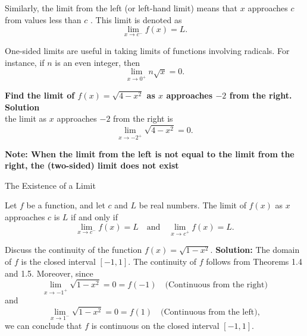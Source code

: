 \documentclass[12pt]{article}
\theoremstyle{beautifulthm}
\begin{document}
Similarly, the limit from the left (or left-hand limit) means that \( x \) approaches \( c \) from values less than \( c \) . This limit is denoted as
\[
\lim_{x \to c^-} f(x) = L.
\]

One-sided limits are useful in taking limits of functions involving radicals. For instance, if \( n \) is an even integer, then
\[
\lim_{x \to 0^+} n\sqrt{x} = 0.
\]

\begin{tcolorbox}[colback=examplebg, colframe=red!75!black, title=\textbf{EXAMPLE 2: A One-Sided Limit}, fonttitle=\bfseries, sharp corners]
\textbf{Find the limit of \( f(x) = \sqrt{4 - x^2} \) as \( x \) approaches \(-2\) from the right.}
\tcblower
\textbf{Solution} \\
the limit as \( x \) approaches \(-2\) from the right is 
\[
\lim_{x \to -2^+} \sqrt{4 - x^2} = 0.
\]

\end{tcolorbox}
\textbf{Note: When the limit from the left is not equal to the limit from the right, the (two-sided) limit does not exist}
\begin{mytheorem}{The Existence of a Limit}{}

Let \( f \) be a function, and let \( c \) and \( L \) be real numbers. The limit of \( f(x) \) as \( x \) approaches \( c \) is \( L \) if and only if
\[
\lim_{x \to c^-} f(x) = L \quad \text{and} \quad \lim_{x \to c^+} f(x) = L.
\]
\end{mytheorem}
\begin{tcolorbox}[colback=examplebg, colframe=red!75!black, title=\textbf{EXAMPLE 3: Continuity on a Closed Interval}, fonttitle=\bfseries, sharp corners]
Discuss the continuity of the function $f(x) = \sqrt{1 - x^2}$.
\tcblower
\textbf{Solution:}
The domain of $f$ is the closed interval $[-1, 1]$. The continuity of $f$ follows from Theorems 1.4 and 1.5. Moreover, since
\[
\lim_{x \to -1^+} \sqrt{1 - x^2} = 0 = f(-1) \quad \text{(Continuous from the right)}
\]
and
\[
\lim_{x \to 1^-} \sqrt{1 - x^2} = 0 = f(1) \quad \text{(Continuous from the left)},
\]
we can conclude that $f$ is continuous on the closed interval $[-1, 1]$.
\end{tcolorbox}
\end{document}
